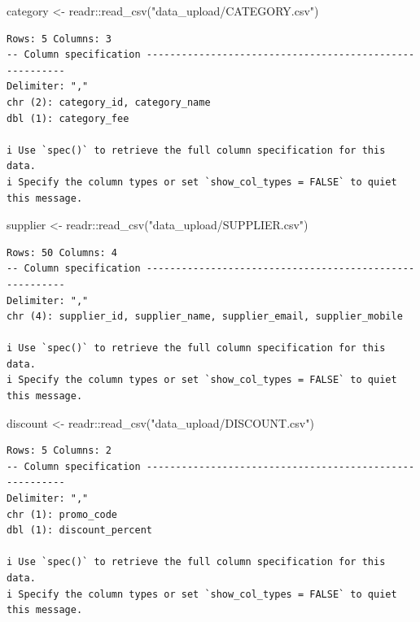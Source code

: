 \documentclass[
  letterpaper,
  DIV=11,
  numbers=noendperiod]{scrartcl}
\newenvironment{Shaded}{\begin{snugshade}}{\end{snugshade}}
\newcommand{\FunctionTok}[1]{\textcolor[rgb]{0.28,0.35,0.67}{#1}}
\newcommand{\NormalTok}[1]{\textcolor[rgb]{0.00,0.23,0.31}{#1}}
\newcommand{\OtherTok}[1]{\textcolor[rgb]{0.00,0.23,0.31}{#1}}
\newcommand{\SpecialCharTok}[1]{\textcolor[rgb]{0.37,0.37,0.37}{#1}}
\newcommand{\StringTok}[1]{\textcolor[rgb]{0.13,0.47,0.30}{#1}}
\begin{document}
\begin{Shaded}
\begin{Highlighting}[]
\NormalTok{category }\OtherTok{\textless{}{-}}\NormalTok{ readr}\SpecialCharTok{::}\FunctionTok{read\_csv}\NormalTok{(}\StringTok{"data\_upload/CATEGORY.csv"}\NormalTok{)}
\end{Highlighting}
\end{Shaded}

\begin{verbatim}
Rows: 5 Columns: 3
-- Column specification --------------------------------------------------------
Delimiter: ","
chr (2): category_id, category_name
dbl (1): category_fee

i Use `spec()` to retrieve the full column specification for this data.
i Specify the column types or set `show_col_types = FALSE` to quiet this message.
\end{verbatim}

\begin{Shaded}
\begin{Highlighting}[]
\NormalTok{supplier }\OtherTok{\textless{}{-}}\NormalTok{ readr}\SpecialCharTok{::}\FunctionTok{read\_csv}\NormalTok{(}\StringTok{"data\_upload/SUPPLIER.csv"}\NormalTok{)}
\end{Highlighting}
\end{Shaded}

\begin{verbatim}
Rows: 50 Columns: 4
-- Column specification --------------------------------------------------------
Delimiter: ","
chr (4): supplier_id, supplier_name, supplier_email, supplier_mobile

i Use `spec()` to retrieve the full column specification for this data.
i Specify the column types or set `show_col_types = FALSE` to quiet this message.
\end{verbatim}

\begin{Shaded}
\begin{Highlighting}[]
\NormalTok{discount }\OtherTok{\textless{}{-}}\NormalTok{ readr}\SpecialCharTok{::}\FunctionTok{read\_csv}\NormalTok{(}\StringTok{"data\_upload/DISCOUNT.csv"}\NormalTok{)}
\end{Highlighting}
\end{Shaded}

\begin{verbatim}
Rows: 5 Columns: 2
-- Column specification --------------------------------------------------------
Delimiter: ","
chr (1): promo_code
dbl (1): discount_percent

i Use `spec()` to retrieve the full column specification for this data.
i Specify the column types or set `show_col_types = FALSE` to quiet this message.
\end{verbatim}
\end{document}

